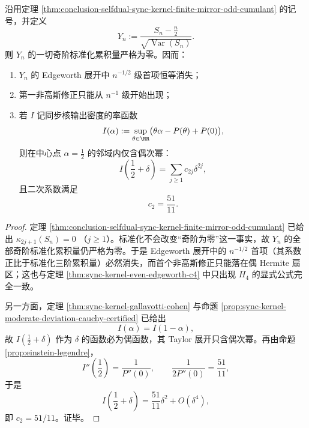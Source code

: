 \begin{corollary}\label{cor:conclusion-selfdual-sync-kernel-edgeworth-evenness}
沿用定理 \ref{thm:conclusion-selfdual-sync-kernel-finite-mirror-odd-cumulant} 的记号，并定义
\[
Y_n:=\frac{S_n-\frac{n}{2}}{\sqrt{\operatorname{Var}(S_n)}}.
\]
则 \(Y_n\) 的一切奇阶标准化累积量严格为零。因而：
\begin{enumerate}
  \item \(Y_n\) 的 Edgeworth 展开中 \(n^{-1/2}\) 级首项恒等消失；
  \item 第一非高斯修正只能从 \(n^{-1}\) 级开始出现；
  \item 若 \(I\) 记同步核输出密度的率函数
  \[
  I(\alpha):=\sup_{\theta\in\RR}\bigl(\theta\alpha-P(\theta)+P(0)\bigr),
  \]
  则在中心点 \(\alpha=\tfrac12\) 的邻域内仅含偶次幂：
  \[
  I\!\left(\frac12+\delta\right)=\sum_{j\ge 1}c_{2j}\delta^{2j},
  \]
  且二次系数满足
  \[
  c_2=\frac{51}{11}.
  \]
\end{enumerate}
\end{corollary}
\begin{proof}
定理 \ref{thm:conclusion-selfdual-sync-kernel-finite-mirror-odd-cumulant} 已给出
\(
\kappa_{2j+1}(S_n)=0
\)
（\(j\ge 1\)）。标准化不会改变“奇阶为零”这一事实，故 \(Y_n\) 的全部奇阶标准化累积量仍严格为零。于是 Edgeworth 展开中的 \(n^{-1/2}\) 首项（其系数正比于标准化三阶累积量）必然消失，而首个非高斯修正只能落在偶 Hermite 扇区；这也与定理 \ref{thm:sync-kernel-even-edgeworth-c4} 中只出现 \(H_4\) 的显式公式完全一致。

另一方面，定理 \ref{thm:sync-kernel-gallavotti-cohen} 与命题 \ref{prop:sync-kernel-moderate-deviation-cauchy-certified} 已给出
\[
I(\alpha)=I(1-\alpha),
\]
故 \(I(\tfrac12+\delta)\) 作为 \(\delta\) 的函数必为偶函数，其 Taylor 展开只含偶次幂。再由命题 \ref{prop:einstein-legendre}，
\[
I''\!\left(\frac12\right)=\frac{1}{P''(0)},
\qquad
\frac{1}{2P''(0)}=\frac{51}{11},
\]
于是
\[
I\!\left(\frac12+\delta\right)=\frac{51}{11}\delta^2+O(\delta^4),
\]
即 \(c_2=51/11\)。证毕。
\end{proof}

